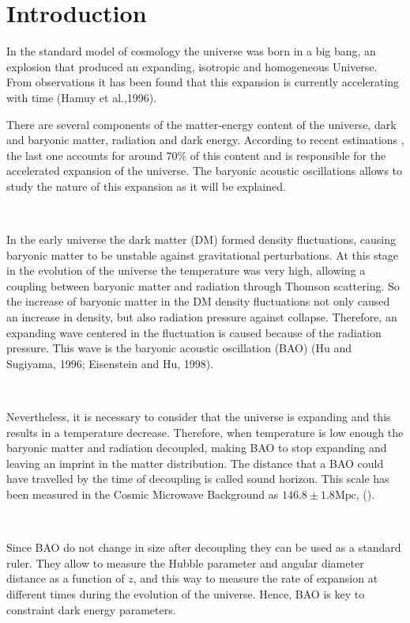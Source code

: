 \chapter{Introduction}\label{intro}


In the standard model of cosmology the universe was born in a big bang, an explosion that produced an
expanding, isotropic and homogeneous Universe. From observations it has been found that this expansion  
is currently accelerating with time (Hamuy et al.,1996). 

There are several components of the matter-energy content of the universe, 
dark and baryonic matter, radiation and dark energy. According to recent estimations \citep{DEF}, the last one accounts for 
around $70\%$ of this content and is responsible for the accelerated expansion of the universe. 
The baryonic acoustic oscillations allows to study the nature of this expansion as it will be explained.

\

In the early universe the dark matter (DM) formed density fluctuations, causing baryonic matter to be unstable against
gravitational perturbations. At this stage in the evolution of the universe the temperature was very high, allowing a coupling between
baryonic matter and radiation through Thomson scattering. 
So the increase of baryonic matter in the DM density fluctuations not only caused an increase 
in density, but also radiation pressure against collapse. Therefore, an expanding wave centered in the fluctuation
is caused because of the radiation pressure. This wave is the baryonic acoustic oscillation (BAO) (Hu and Sugiyama, 1996;
Eisenstein and Hu, 1998). 

\	

Nevertheless, it is necessary to consider that the universe is expanding and this results in a  
temperature decrease. Therefore, when temperature is low enough the baryonic matter and radiation 
decoupled, making BAO to stop expanding and leaving an imprint in the matter distribution. 
The distance that a BAO could have travelled by the time of
decoupling is called sound horizon. This scale has been measured in the Cosmic Microwave Background 
as $146.8\pm 1.8 \mathrm{Mpc}$, (\cite{SIZE}).  

\

Since BAO do not change in size after decoupling they can be used as a standard ruler.  They allow to
measure the Hubble parameter and angular diameter distance as a function of $z$, and this way to measure the rate 
of expansion at different times during the evolution of the universe. Hence, BAO is key to constraint dark energy 
parameters. 

